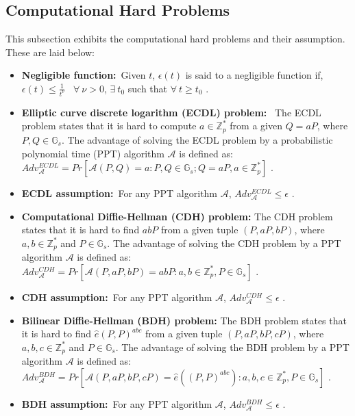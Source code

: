 \documentclass[10pt,journal,letterpaper]{IEEEtran}
\begin{document}
\subsection{Computational Hard Problems}
This subsection exhibits the computational hard problems and their
assumption. These are laid below:
\begin{itemize}
\item \textbf{Negligible function:}~Given $t$, $\epsilon(t)$ is said
to a negligible function if, $\epsilon(t)\le\frac{1}{t^{\nu}}$~
$\forall~\nu>0$, $\exists~t_{0}$ such that $\forall~t\ge t_{0}$
\cite{is5}.

\item \textbf{Elliptic curve discrete logarithm (ECDL) problem:}~
The ECDL problem states that it is hard to compute $a \in
\mathbb{Z}^{*}_{p}$ from a given $Q = aP$, where
$P,Q\in\mathbb{G}_s$. The advantage of solving the ECDL problem by a
probabilistic polynomial time (PPT) algorithm $\mathcal{A}$ is
defined as: $Adv_{\mathcal{A}}^{ECDL} = Pr[\mathcal{A}(P, Q) = a: P,
Q\in \mathbb{G}_s; Q = aP, a\in\mathbb{Z}^{*}_{p}]$ \cite{is5}.

\item \textbf{ECDL assumption:}~For any PPT algorithm $\mathcal{A}$,
$Adv_{\mathcal{A}}^{ECDL}\leq\epsilon$ \cite{is5}.

\item \textbf{Computational Diffie-Hellman (CDH) problem:} The
CDH problem states that it is hard to find $abP$ from a given tuple
$(P, aP, bP)$, where $a, b\in\mathbb{Z}^{*}_{p}$ and
$P\in\mathbb{G}_s$. The advantage of solving the CDH problem by a
PPT algorithm $\mathcal{A}$ is defined as: $Adv_{\mathcal{A}}^{CDH}=
Pr[\mathcal{A}(P, aP, bP) = abP: a, b\in\mathbb{Z}^{*}_{p},
P\in\mathbb{G}_s]$ \cite{is4}.

\item \textbf{CDH assumption:}~For any PPT algorithm $\mathcal{A}$,
$Adv_{\mathcal{A}}^{CDH}\leq\epsilon$ \cite{is4}.

\item \textbf{Bilinear Diffie-Hellman (BDH) problem:} The
BDH problem states that it is hard to find $\hat{e}(P, P)^{abc}$
from a given tuple $(P, aP, bP, cP)$, where $a, b,
c\in\mathbb{Z}^{*}_{p}$ and $P\in\mathbb{G}_s$. The advantage of
solving the BDH problem by a PPT algorithm $\mathcal{A}$ is defined
as: $Adv_{\mathcal{A}}^{BDH}= Pr[\mathcal{A}(P, aP, bP, cP)=
\hat{e}((P, P)^{abc}): a, b, c\in\mathbb{Z}^{*}_{p},
P\in\mathbb{G}_s]$ \cite{is4}.

\item \textbf{BDH assumption:}~For any PPT algorithm $\mathcal{A}$,
$Adv_{\mathcal{A}}^{BDH}\leq\epsilon$ \cite{is4}.
\end{itemize}
\end{document}
